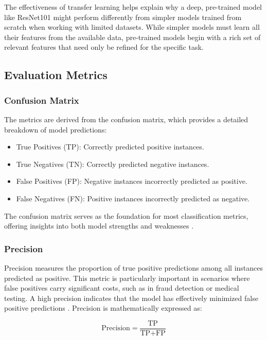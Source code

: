 The effectiveness of transfer learning helps explain why a deep, pre-trained model like ResNet101 might perform differently from simpler models trained from scratch when working with limited datasets. While simpler models must learn all their features from the available data, pre-trained models begin with a rich set of relevant features that need only be refined for the specific task.

\subsection{Evaluation Metrics}

\subsubsection{Confusion Matrix}
The metrics are derived from the confusion matrix, which provides a detailed breakdown of model predictions:
\begin{itemize}
    \item True Positives (TP): Correctly predicted positive instances.
    \item True Negatives (TN): Correctly predicted negative instances.
    \item False Positives (FP): Negative instances incorrectly predicted as positive.
    \item False Negatives (FN): Positive instances incorrectly predicted as negative.
\end{itemize}

The confusion matrix serves as the foundation for most classification metrics, offering insights into both model strengths and weaknesses \cite{article, dalianis2018clinical}.

\subsubsection{Precision}
Precision measures the proportion of true positive predictions among all instances predicted as positive. This metric is particularly important in scenarios where false positives carry significant costs, such as in fraud detection or medical testing. A high precision indicates that the model has effectively minimized false positive predictions \cite{article}. Precision is mathematically expressed as: 

\begin{equation}
    \text{Precision} = \frac{\text{TP}}{\text{TP} + \text{FP}}
\end{equation}

